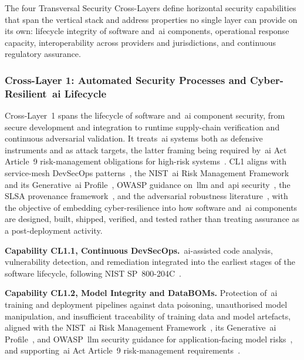 \documentclass{ieeeaccess}
\begin{document}
The four Transversal Security Cross-Layers define horizontal security capabilities that span the vertical stack and address properties no single layer can provide on its own: lifecycle integrity of software and~\gls{ai} components, operational response capacity, interoperability across providers and jurisdictions, and continuous regulatory assurance.

\subsubsection{Cross-Layer 1: Automated Security Processes and Cyber-Resilient~\gls{ai} Lifecycle}
\label{sec:CL1}

Cross-Layer~1 spans the lifecycle of software and~\gls{ai} component security, from secure development and integration to runtime supply-chain verification and continuous adversarial validation. It treats~\gls{ai} systems both as defensive instruments and as attack targets, the latter framing being required by~\gls{ai} Act Article~9 risk-management obligations for high-risk systems~\cite{euaiact}. CL1 aligns with service-mesh DevSecOps patterns~\cite{chandramouli2022devsecops}, the NIST~\gls{ai} Risk Management Framework and its Generative~\gls{ai} Profile~\cite{nistairmf,nistaigenai}, OWASP guidance on~\gls{llm} and~\gls{api} security~\cite{owaspllm,owaspapi}, the SLSA provenance framework~\cite{slsa2023}, and the adversarial robustness literature~\cite{madry2018}, with the objective of embedding cyber-resilience into how software and~\gls{ai} components are designed, built, shipped, verified, and tested rather than treating assurance as a post-deployment activity.

\textbf{Capability CL1.1, Continuous DevSecOps.}~\gls{ai}-assisted code analysis, vulnerability detection, and remediation integrated into the earliest stages of the software lifecycle, following NIST SP~800-204C~\cite{chandramouli2022devsecops}.

\textbf{Capability CL1.2, Model Integrity and DataBOMs.} Protection of~\gls{ai} training and deployment pipelines against data poisoning, unauthorised model manipulation, and insufficient traceability of training data and model artefacts, aligned with the NIST~\gls{ai} Risk Management Framework~\cite{nistairmf}, its Generative~\gls{ai} Profile~\cite{nistaigenai}, and OWASP~\gls{llm} security guidance for application-facing model risks~\cite{owaspllm}, and supporting~\gls{ai} Act Article~9 risk-management requirements~\cite{euaiact}.
\end{document}
